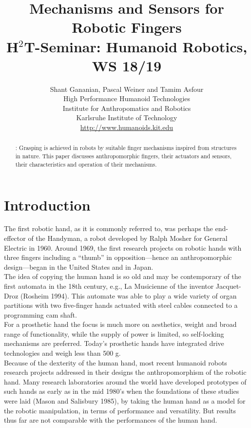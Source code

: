 \documentclass[a4paper, 10pt, conference]{ieeeconf}      %
\title{\bf {\LARGE Mechanisms and Sensors for Robotic Fingers} \\
{\normalsize H$^2$T-Seminar: Humanoid Robotics, WS 18/19}}
\author{Shant Gananian, Pascal Weiner and Tamim Asfour \\ High Performance Humanoid Technologies \\ Institute for Anthropomatics and Robotics \\ Karlsruhe Institute of Technology \\
\url{http://www.humanoids.kit.edu}}
\begin{document}
\maketitle
\thispagestyle{empty}
\pagestyle{empty}
%
\begin{abstract}
: Grasping is achieved in robots by suitable finger mechanisms inspired from structures in nature. This paper discusses anthropomorphic fingers, their actuators and sensors, their characteristics and operation of their mechanisms.
\end{abstract}

\section{\textbf{Introduction}}
The first robotic hand, as it is commonly referred to, was perhaps the end-effector of the Handyman, a robot developed by Ralph Mosher for General Electric in 1960. Around 1969, the first research projects on robotic hands with three fingers including a “thumb” in opposition—hence an anthropomorphic design—began in the United States and in Japan.\\
The idea of copying the human hand is so old and may be contemporary of the first automata in the 18th century, e.g., La Musicienne of the inventor Jacquet-Droz (Rosheim 1994). This automate was able to play a wide variety of organ partitions with two five-finger hands actuated with steel cables connected to a programming cam shaft.\\
For a prosthetic hand the focus is much more on aesthetics, weight and broad range of functionality, while the supply of power is limited, so self-locking mechanisms are preferred. Today’s prosthetic hands have integrated drive technologies and weigh less than 500 g.\\
Because of the dexterity of the human hand, most recent humanoid robots research projects addressed in their designs the anthropomorphism of the robotic hand. Many research laboratories around the world have developed prototypes of such hands as early as in the mid 1980’s when the foundations of these studies were laid (Mason and Salisbury 1985), by taking the human hand as a model for the robotic manipulation, in terms of performance and versatility. But results thus far are not comparable with the performances of the human hand.\\
\end{document}
